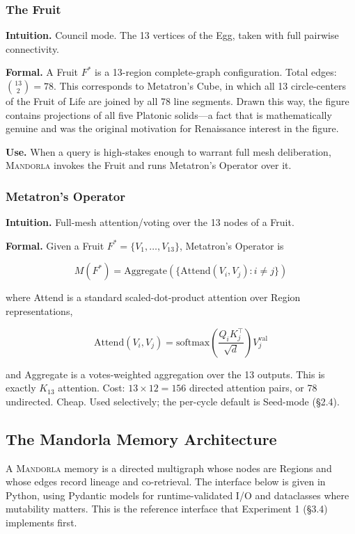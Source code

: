 \documentclass[11pt,a4paper]{article}
\begin{document}
\subsubsection*{The Fruit}

\textbf{Intuition.} Council mode. The 13 vertices of the Egg, taken with full pairwise connectivity.

\textbf{Formal.} A Fruit $F^*$ is a 13-region complete-graph configuration. Total edges: $\binom{13}{2} = 78$. This corresponds to Metatron's Cube, in which all 13 circle-centers of the Fruit of Life are joined by all 78 line segments. Drawn this way, the figure contains projections of all five Platonic solids---a fact that is mathematically genuine and was the original motivation for Renaissance interest in the figure.

\textbf{Use.} When a query is high-stakes enough to warrant full mesh deliberation, \textsc{Mandorla} invokes the Fruit and runs Metatron's Operator over it.

\subsubsection*{Metatron's Operator}

\textbf{Intuition.} Full-mesh attention/voting over the 13 nodes of a Fruit.

\textbf{Formal.} Given a Fruit $F^* = \{V_1, \ldots, V_{13}\}$, Metatron's Operator is

\[ M(F^*) = \mathrm{Aggregate}\!\left(\{\mathrm{Attend}(V_i, V_j) : i \neq j\}\right) \]

where Attend is a standard scaled-dot-product attention over Region representations,

\[ \mathrm{Attend}(V_i, V_j) = \mathrm{softmax}\!\left(\frac{Q_i K_j^\top}{\sqrt{d}}\right) V_j^{\mathrm{val}} \]

and Aggregate is a votes-weighted aggregation over the 13 outputs. This is exactly $K_{13}$ attention. Cost: $13 \times 12 = 156$ directed attention pairs, or 78 undirected. Cheap. Used selectively; the per-cycle default is Seed-mode (\S 2.4).

\subsection{The Mandorla Memory Architecture}

A \textsc{Mandorla} memory is a directed multigraph whose nodes are Regions and whose edges record lineage and co-retrieval. The interface below is given in Python, using Pydantic models for runtime-validated I/O and dataclasses where mutability matters. This is the reference interface that Experiment 1 (\S 3.4) implements first.
\end{document}
